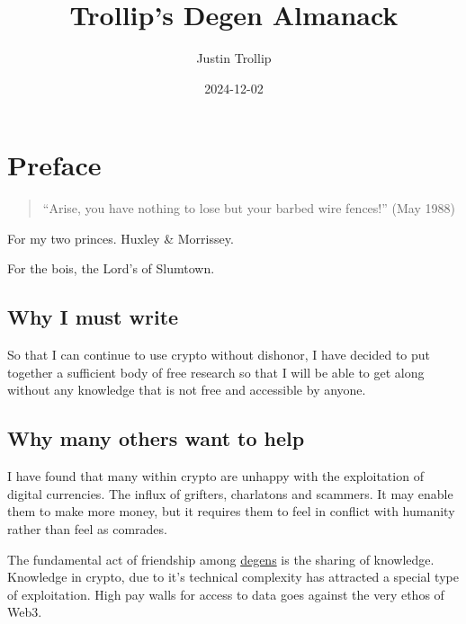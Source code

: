 \documentclass[
  letterpaper,
  DIV=11,
  numbers=noendperiod]{scrreprt}
\title{Trollip's Degen Almanack}
\author{Justin Trollip}
\date{2024-12-02}
\renewcommand*\contentsname{Table of contents}
\newcommand\contentsname{Table of contents}
\begin{document}
\maketitle

\renewcommand*\contentsname{Table of contents}
{
\hypersetup{linkcolor=}
\setcounter{tocdepth}{2}
\tableofcontents
}


\chapter*{Preface}\label{preface}


\begin{quote}
``Arise, you have nothing to lose but your barbed wire fences!'' (May
1988)
\end{quote}

For my two princes. Huxley \& Morrissey.

For the bois, the Lord's of Slumtown.

\section*{Why I must write}\label{why-i-must-write}


So that I can continue to use crypto without dishonor, I have decided to
put together a sufficient body of free research so that I will be able
to get along without any knowledge that is not free and accessible by
anyone.

\section*{Why many others want to
help}\label{why-many-others-want-to-help}


I have found that many within crypto are unhappy with the exploitation
of digital currencies. The influx of grifters, charlatons and scammers.
It may enable them to make more money, but it requires them to feel in
conflict with humanity rather than feel as comrades.

The fundamental act of friendship among \hyperref[degens]{degens} is the
sharing of knowledge. Knowledge in crypto, due to it's technical
complexity has attracted a special type of exploitation. High pay walls
for access to data goes against the very ethos of Web3.
\end{document}
